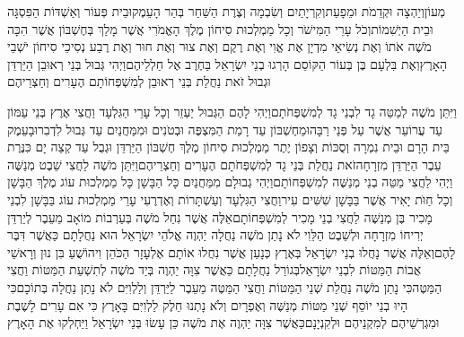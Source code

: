 \documentclass[../main/main.tex]{subfiles}
\begin{document}
\begin{multicols*}{\ncols}
מְעוֹן\PreVerseSpace{}וְיַהְצָה וּקְדֵמֹת וּמֵפָעַת\PreVerseSpace{}וְקִרְיָתַיִם וְשִׂבְמָה וְצֶרֶת הַשַּׁחַר בְּהַר הָעֵמֶק\PreVerseSpace{}וּבֵית פְּעוֹר וְאַשְׁדּוֹת הַפִּסְגָּה וּבֵית הַיְשִׁמוֹת\PreVerseSpace{}וְכֹל עָרֵי הַמִּישֹׁר וְכָל מַמְלְכוּת סִיחוֹן מֶלֶךְ הָאֱמֹרִי אֲשֶׁר מָלַךְ בְּחֶשְׁבּוֹן אֲשֶׁר הִכָּה מֹשֶׁה אֹתוֹ וְאֶת נְשִׂיאֵי מִדְיָן אֶת אֱוִי וְאֶת רֶקֶם וְאֶת צוּר וְאֶת חוּר וְאֶת רֶבַע נְסִיכֵי סִיחוֹן יֹשְׁבֵי הָאָרֶץ\PreVerseSpace{}וְאֶת בִּלְעָם בֶּן בְּעוֹר הַקּוֹסֵם הָרְגוּ בְנֵי יִשְׂרָאֵל בַּחֶרֶב אֶל חַלְלֵיהֶם\PreVerseSpace{}וַיְהִי גְּבוּל בְּנֵי רְאוּבֵן הַיַּרְדֵּן וּגְבוּל זֹאת נַחֲלַת בְּנֵי רְאוּבֵן לְמִשְׁפְּחוֹתָם הֶעָרִים וְחַצְרֵיהֶם\SubEnd{}\OpenSection{}\par
{}וַיִּתֵּן מֹשֶׁה לְמַטֵּה גָד לִבְנֵי גָד לְמִשְׁפְּחֹתָם\PreVerseSpace{}וַיְהִי לָהֶם הַגְּבוּל יַעְזֵר וְכָל עָרֵי הַגִּלְעָד וַחֲצִי אֶרֶץ בְּנֵי עַמּוֹן עַד עֲרוֹעֵר אֲשֶׁר עַל פְּנֵי רַבָּה\PreVerseSpace{}וּמֵחֶשְׁבּוֹן עַד רָמַת הַמִּצְפֶּה וּבְטֹנִים וּמִמַּחֲנַיִם עַד גְּבוּל לִדְבִר\PreVerseSpace{}וּבָעֵמֶק בֵּית הָרָם וּבֵית נִמְרָה וְסֻכּוֹת וְצָפוֹן יֶתֶר מַמְלְכוּת סִיחוֹן מֶלֶךְ חֶשְׁבּוֹן הַיַּרְדֵּן וּגְבֻל עַד קְצֵה יָם כִּנֶּרֶת עֵבֶר הַיַּרְדֵּן מִזְרָחָה\PreVerseSpace{}זֹאת נַחֲלַת בְּנֵי גָד לְמִשְׁפְּחֹתָם הֶעָרִים וְחַצְרֵיהֶם\PreVerseSpace{}וַיִּתֵּן מֹשֶׁה לַחֲצִי שֵׁבֶט מְנַשֶּׁה וַיְהִי לַחֲצִי מַטֵּה בְנֵי מְנַשֶּׁה לְמִשְׁפְּחוֹתָם\PreVerseSpace{}וַיְהִי גְבוּלָם מִמַּחֲנַיִם כָּל הַבָּשָׁן כָּל מַמְלְכוּת עוֹג מֶלֶךְ הַבָּשָׁן וְכָל חַוֺּת יָאִיר אֲשֶׁר בַּבָּשָׁן שִׁשִּׁים עִיר\PreVerseSpace{}וַחֲצִי הַגִּלְעָד וְעַשְׁתָּרוֹת וְאֶדְרֶעִי עָרֵי מַמְלְכוּת עוֹג בַּבָּשָׁן לִבְנֵי מָכִיר בֶּן מְנַשֶּׁה לַחֲצִי בְנֵי מָכִיר לְמִשְׁפְּחוֹתָם\PreVerseSpace{}אֵלֶּה אֲשֶׁר נִחַל מֹשֶׁה בְּעַרְבוֹת מוֹאָב מֵעֵבֶר לְיַרְדֵּן יְרִיחוֹ מִזְרָחָה \ClosedSection{}וּלְשֵׁבֶט הַלֵּוִי לֹא נָתַן מֹשֶׁה נַחֲלָה יַהְוֶה אֱלֹהֵי יִשְׂרָאֵל הוּא נַחֲלָתָם כַּאֲשֶׁר דִּבֶּר לָהֶם\PreChapterSpace{}וְאֵלֶּה אֲשֶׁר נָחֲלוּ בְנֵי יִשְׂרָאֵל בְּאֶרֶץ כְּנָעַן אֲשֶׁר נִחֲלוּ אוֹתָם אֶלְעָזָר הַכֹּהֵן וִיהוֹשֻׁעַ בִּן נוּן וְרָאשֵׁי אֲבוֹת הַמַּטּוֹת לִבְנֵי יִשְׂרָאֵל\PreVerseSpace{}בְּגוֹרַל נַחֲלָתָם כַּאֲשֶׁר צִוָּה יַהְוֶה בְּיַד מֹשֶׁה לְתִשְׁעַת הַמַּטּוֹת וַחֲצִי הַמַּטֶּה\PreVerseSpace{}כִּי נָתַן מֹשֶׁה נַחֲלַת שְׁנֵי הַמַּטּוֹת וַחֲצִי הַמַּטֶּה מֵעֵבֶר לַיַּרְדֵּן וְלַלְוִיִּם לֹא נָתַן נַחֲלָה בְּתוֹכָם\PreVerseSpace{}כִּי הָיוּ בְנֵי יוֹסֵף שְׁנֵי מַטּוֹת מְנַשֶּׁה וְאֶפְרָיִם וְלֹא נָתְנוּ חֵלֶק לַלְוִיִּם בָּאָרֶץ כִּי אִם עָרִים לָשֶׁבֶת וּמִגְרְשֵׁיהֶם לְמִקְנֵיהֶם וּלְקִנְיָנָם\PreVerseSpace{}כַּאֲשֶׁר צִוָּה יַהְוֶה אֶת מֹשֶׁה כֵּן עָשׂוּ בְּנֵי יִשְׂרָאֵל וַיַּחְלְקוּ אֶת הָאָרֶץ\OpenSection{}\par

\end{multicols*}
\end{document}
